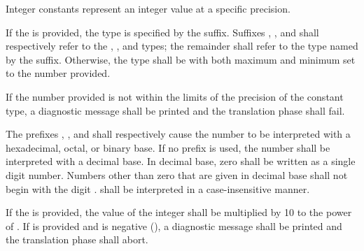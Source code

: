 Integer constants represent an integer value at a specific precision.

\specsubitem
If the  is provided, the type is specified by the
suffix. Suffixes , ,  and  shall
respectively refer to the , , and 
types; the remainder shall refer to the type named by the suffix. Otherwise,
the type shall be  with both maximum and minimum set to the
number provided.

\specsubitem
If the number provided is not within the limits of the precision of the
constant type, a diagnostic message shall be printed and the translation phase
shall fail.

\specsubitem
The prefixes , , and  shall respectively
cause the number to be interpreted with a hexadecimal, octal, or binary base.
If no prefix is used, the number shall be interpreted with a decimal base.
In decimal base, zero shall be written as a single digit number. Numbers other
than zero that are given in decimal base shall not begin with the digit
.  shall be interpreted in a
case-insensitive manner.

\specsubitem
If the  is provided, the value of the
integer shall be multiplied by 10 to the power of .
If  is provided and is negative (\terminal{-}), a diagnostic
message shall be printed and the translation phase shall abort.

